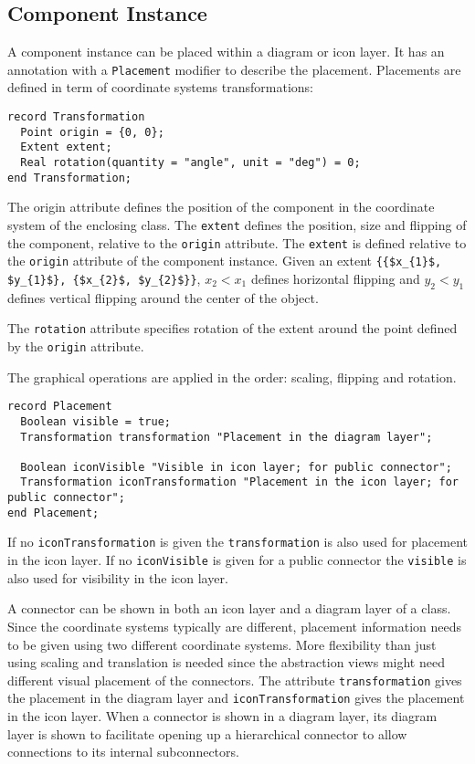 \subsection{Component Instance}\label{component-instance}

A component instance can be placed within a diagram or icon layer.
It has an annotation with a \lstinline!Placement! modifier to describe the placement.
Placements are defined in term of coordinate systems transformations:
\begin{lstlisting}[language=modelica]
record Transformation
  Point origin = {0, 0};
  Extent extent;
  Real rotation(quantity = "angle", unit = "deg") = 0;
end Transformation;
\end{lstlisting}%
The origin attribute defines the position of the component in the coordinate system of the enclosing class.
The \lstinline!extent! defines the position, size and flipping of the component, relative to the \lstinline!origin! attribute.
The \lstinline!extent! is defined relative to the \lstinline!origin! attribute of the component instance.
Given an extent \lstinline!{{$x_{1}$, $y_{1}$}, {$x_{2}$, $y_{2}$}}!, $x_{2} < x_{1}$ defines horizontal flipping and $y_{2} < y_{1}$ defines vertical flipping around the center of the object.

The \lstinline!rotation! attribute specifies rotation of the extent around the point defined by the \lstinline!origin! attribute.

The graphical operations are applied in the order: scaling, flipping and rotation.

\begin{lstlisting}[language=modelica]
record Placement
  Boolean visible = true;
  Transformation transformation "Placement in the diagram layer";

  Boolean iconVisible "Visible in icon layer; for public connector";
  Transformation iconTransformation "Placement in the icon layer; for public connector";
end Placement;
\end{lstlisting}%
If no \lstinline!iconTransformation! is given the \lstinline!transformation! is also used for placement in the icon layer.
If no \lstinline!iconVisible! is given for a public connector the \lstinline!visible! is also used for visibility in the icon layer.

\begin{nonnormative}
A connector can be shown in both an icon layer and a diagram
layer of a class. Since the coordinate systems typically are different,
placement information needs to be given using two different coordinate
systems. More flexibility than just using scaling and translation is
needed since the abstraction views might need different visual placement
of the connectors. The attribute \lstinline!transformation! gives the placement in
the diagram layer and \lstinline!iconTransformation! gives the placement in the icon
layer. When a connector is shown in a diagram layer, its diagram layer
is shown to facilitate opening up a hierarchical connector to allow
connections to its internal subconnectors.
\end{nonnormative}

